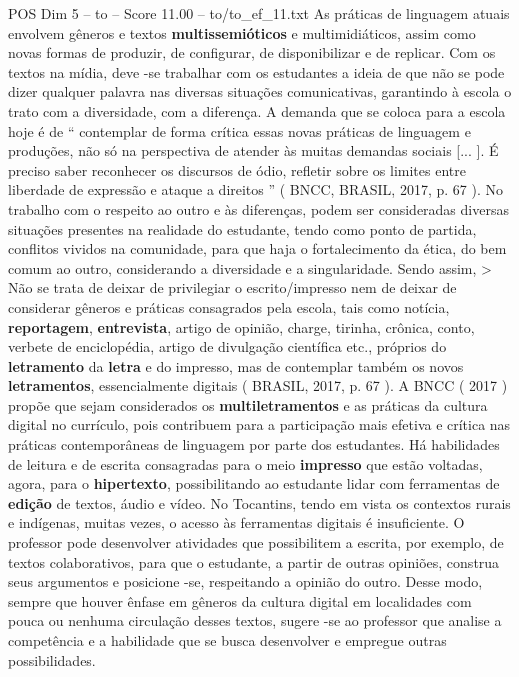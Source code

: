 \begin{textsample}{POS Dim 5 – to – Score 11.00 – to/to\_ef\_11.txt}
As práticas de linguagem atuais envolvem gêneros e textos \textbf{multissemióticos} e multimidiáticos, assim como novas formas de produzir, de configurar, de disponibilizar e de replicar.
Com os textos na mídia, deve -se trabalhar com os estudantes a ideia de que não se pode dizer qualquer palavra nas diversas situações comunicativas, garantindo à escola o trato com a diversidade, com a diferença.
A demanda que se coloca para a escola hoje é de “ contemplar de forma crítica essas novas práticas de linguagem e produções, não só na perspectiva de atender às muitas demandas sociais [... ].
É preciso saber reconhecer os discursos de ódio, refletir sobre os limites entre liberdade de expressão e ataque a direitos ” ( BNCC, BRASIL, 2017, p. 67 ).
No trabalho com o respeito ao outro e às diferenças, podem ser consideradas diversas situações presentes na realidade do estudante, tendo como ponto de partida, conflitos vividos na comunidade, para que haja o fortalecimento da ética, do bem comum ao outro, considerando a diversidade e a singularidade.
Sendo assim, > Não se trata de deixar de privilegiar o escrito/impresso nem de deixar de considerar gêneros e práticas consagrados pela escola, tais como notícia, \textbf{reportagem}, \textbf{entrevista}, artigo de opinião, charge, tirinha, crônica, conto, verbete de enciclopédia, artigo de divulgação científica etc., próprios do \textbf{letramento} da \textbf{letra} e do impresso, mas de contemplar também os novos \textbf{letramentos}, essencialmente digitais ( BRASIL, 2017, p. 67 ).
A BNCC ( 2017 ) propõe que sejam considerados os \textbf{multiletramentos} e as práticas da cultura digital no currículo, pois contribuem para a participação mais efetiva e crítica nas práticas contemporâneas de linguagem por parte dos estudantes.
Há habilidades de leitura e de escrita consagradas para o meio \textbf{impresso} que estão voltadas, agora, para o \textbf{hipertexto}, possibilitando ao estudante lidar com ferramentas de \textbf{edição} de textos, áudio e vídeo.
No Tocantins, tendo em vista os contextos rurais e indígenas, muitas vezes, o acesso às ferramentas digitais é insuficiente.
O professor pode desenvolver atividades que possibilitem a escrita, por exemplo, de textos colaborativos, para que o estudante, a partir de outras opiniões, construa seus argumentos e posicione -se, respeitando a opinião do outro.
Desse modo, sempre que houver ênfase em gêneros da cultura digital em localidades com pouca ou nenhuma circulação desses textos, sugere -se ao professor que analise a competência e a habilidade que se busca desenvolver e empregue outras possibilidades.

\end{textsample}
